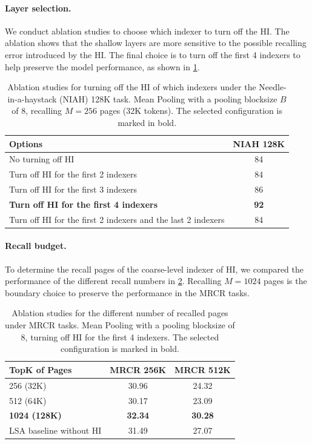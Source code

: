 \documentclass{article}
\begin{document}
\paragraph{Layer selection.}
We conduct ablation studies to choose which indexer to turn off the HI. The ablation shows that the shallow layers are more sensitive to the possible recalling error introduced by the HI. The final choice is to turn off the first 4 indexers to help preserve the model performance, as shown in \cref{tab:pooling_layer_ablations}.


\begin{table}[h]
\centering
\small
\caption{Ablation studies for turning off the HI of which indexers under the Needle-in-a-haystack (NIAH) 128K task. Mean Pooling with a pooling blocksize $B$ of 8, recalling $M=256$ pages (32K tokens). The selected configuration is marked in bold.}
\label{tab:pooling_layer_ablations}
\begin{tabular}{l|c}
\toprule
\textbf{Options} & \textbf{NIAH 128K} \\
\midrule
No turning off HI & 84  \\
Turn off HI for the first 2 indexers & 84 \\
Turn off HI for the first 3 indexers & 86 \\
\textbf{Turn off HI for the first 4 indexers} & \textbf{92} \\
Turn off HI for the first 2 indexers and the last 2 indexers & 84 \\
\bottomrule
\end{tabular}
\end{table}


\paragraph{Recall budget.}
To determine the recall pages of the coarse-level indexer of HI, we compared the performance of the different recall numbers in \cref{tab:pooling_topk_comparison}. Recalling $M=1024$ pages is the boundary choice to preserve the performance in the MRCR tasks.
\begin{table}[h]
\centering
\small
\caption{Ablation studies for the different number of recalled pages under MRCR tasks. Mean Pooling with a pooling blocksize of 8, turning off HI for the first 4 indexers. The selected configuration is marked in bold.}
\label{tab:pooling_topk_comparison}
\begin{tabular}{l|cc}
\toprule
\textbf{TopK of Pages} & \textbf{MRCR 256K} & \textbf{MRCR 512K} \\
\midrule
256 (32K)  & 30.96 & 24.32 \\
512 (64K)  & 30.17 & 23.09 \\
\textbf{1024 (128K)}  & \textbf{32.34} & \textbf{30.28} \\
\midrule
LSA baseline without HI & 31.49 & 27.07 \\
\bottomrule
\end{tabular}
\end{table}
\end{document}
